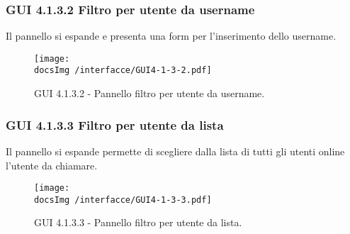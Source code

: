 \subsubsection{GUI 4.1.3.2 Filtro per utente da username}
Il pannello si espande e presenta una form per l’inserimento dello username.
\begin{figure}[htbp]
\centering
\texttt{[image: \\docsImg /interfacce/GUI4-1-3-2.pdf]}
\caption{GUI 4.1.3.2 - Pannello filtro per utente da username.}
\end{figure}

\newpage
\subsubsection{GUI 4.1.3.3 Filtro per utente da lista}
Il pannello si espande permette di scegliere dalla lista di tutti gli utenti online l’utente da chiamare.
\begin{figure}[htbp]
\centering
\texttt{[image: \\docsImg /interfacce/GUI4-1-3-3.pdf]}
\caption{GUI 4.1.3.3 - Pannello filtro per utente da lista.}
\end{figure}